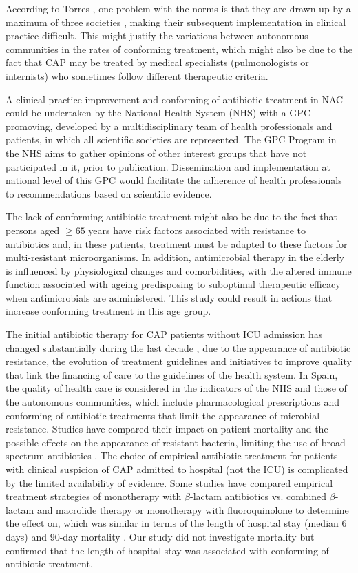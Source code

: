 \documentclass[11pt, a4paper]{article}
\begin{document}
\begin{multicols}{2}
According to Torres \cite{torres2013guia}, one problem with the norms is that they are drawn up by a maximum of three societies \cite{pachon2009clinical}, making their subsequent implementation in clinical practice difficult. This might justify the variations between autonomous communities in the rates of conforming treatment, which might also be due to the fact that CAP may be treated by medical specialists (pulmonologists or internists) who sometimes follow different therapeutic criteria.

A clinical practice improvement and conforming of antibiotic treatment in NAC could be undertaken by the National Health System (NHS) with a GPC promoving, developed by a multidisciplinary team of health professionals and patients, in which all scientific societies are represented. The GPC Program in the NHS aims to gather opinions of other interest groups that have not participated in it, prior to publication. Dissemination and implementation at national level of this GPC would facilitate the adherence of health professionals to recommendations based on scientific evidence.

The lack of conforming antibiotic treatment might also be due to the fact that persons aged $\geq65$ years have risk factors associated with resistance to antibiotics and, in these patients, treatment must be adapted to these factors for multi-resistant microorganisms. In addition, antimicrobial therapy in the elderly is influenced by physiological changes and comorbidities, with the altered immune function associated with ageing predisposing to suboptimal therapeutic efficacy when antimicrobials are administered. This study could result in actions that increase conforming treatment in this age group.

The initial antibiotic therapy for CAP patients without ICU admission has changed substantially during the last decade \cite{berger2014patterns}, due to the appearance of antibiotic resistance, the evolution of treatment guidelines and initiatives to improve quality that link the financing of care to the guidelines of the health system. In Spain, the quality of health care is considered in the indicators of the NHS and those of the autonomous communities, which include pharmacological prescriptions and conforming of antibiotic treatments that limit the appearance of microbial resistance. Studies have compared their impact on patient mortality and the possible effects on the appearance of resistant bacteria, limiting the use of broad-spectrum antibiotics \cite{postma2015antibiotic, pradelli2015community, wang2016comparative}. The choice of empirical antibiotic treatment for patients with clinical suspicion of CAP admitted to hospital (not the ICU) is complicated by the limited availability of evidence. Some studies have compared empirical treatment strategies of monotherapy with $\beta$-lactam antibiotics vs. combined $\beta$-lactam and macrolide therapy or monotherapy with fluoroquinolone to determine the effect on, which was similar in terms of the length of hospital stay (median 6 days) and 90-day mortality \cite{postma2015antibiotic}. Our study did not investigate mortality but confirmed that the length of hospital stay was associated with conforming of antibiotic treatment.


\end{multicols}
\end{document}
